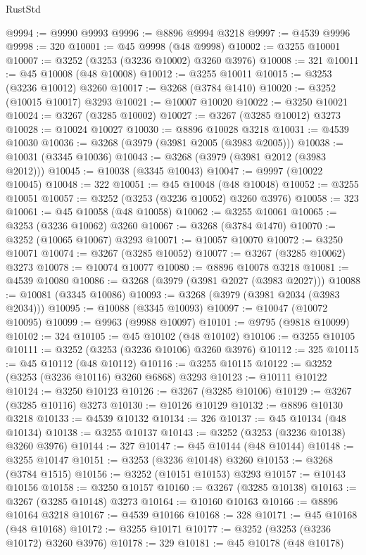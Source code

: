 \begin{lexlean}{RustStd}
\begin{coremodule}
@9994 := @9990 @9993
@9996 := @8896 @9994 @3218
@9997 := @4539 @9996
@9998 := 320
@10001 := @45 @9998 (@48 @9998)
@10002 := @3255 @10001
@10007 := @3252 (@3253 (@3236 @10002) @3260 @3976)
@10008 := 321
@10011 := @45 @10008 (@48 @10008)
@10012 := @3255 @10011
@10015 := @3253 (@3236 @10012) @3260
@10017 := @3268 (@3784 @1410)
@10020 := @3252 (@10015 @10017) @3293
@10021 := @10007 @10020
@10022 := @3250 @10021
@10024 := @3267 (@3285 @10002)
@10027 := @3267 (@3285 @10012) @3273
@10028 := @10024 @10027
@10030 := @8896 @10028 @3218
@10031 := @4539 @10030
@10036 := @3268 (@3979 (@3981 @2005 (@3983 @2005)))
@10038 := @10031 (@3345 @10036)
@10043 := @3268 (@3979 (@3981 @2012 (@3983 @2012)))
@10045 := @10038 (@3345 @10043)
@10047 := @9997 (@10022 @10045)
@10048 := 322
@10051 := @45 @10048 (@48 @10048)
@10052 := @3255 @10051
@10057 := @3252 (@3253 (@3236 @10052) @3260 @3976)
@10058 := 323
@10061 := @45 @10058 (@48 @10058)
@10062 := @3255 @10061
@10065 := @3253 (@3236 @10062) @3260
@10067 := @3268 (@3784 @1470)
@10070 := @3252 (@10065 @10067) @3293
@10071 := @10057 @10070
@10072 := @3250 @10071
@10074 := @3267 (@3285 @10052)
@10077 := @3267 (@3285 @10062) @3273
@10078 := @10074 @10077
@10080 := @8896 @10078 @3218
@10081 := @4539 @10080
@10086 := @3268 (@3979 (@3981 @2027 (@3983 @2027)))
@10088 := @10081 (@3345 @10086)
@10093 := @3268 (@3979 (@3981 @2034 (@3983 @2034)))
@10095 := @10088 (@3345 @10093)
@10097 := @10047 (@10072 @10095)
@10099 := @9963 (@9988 @10097)
@10101 := @9795 (@9818 @10099)
@10102 := 324
@10105 := @45 @10102 (@48 @10102)
@10106 := @3255 @10105
@10111 := @3252 (@3253 (@3236 @10106) @3260 @3976)
@10112 := 325
@10115 := @45 @10112 (@48 @10112)
@10116 := @3255 @10115
@10122 := @3252 (@3253 (@3236 @10116) @3260 @6868) @3293
@10123 := @10111 @10122
@10124 := @3250 @10123
@10126 := @3267 (@3285 @10106)
@10129 := @3267 (@3285 @10116) @3273
@10130 := @10126 @10129
@10132 := @8896 @10130 @3218
@10133 := @4539 @10132
@10134 := 326
@10137 := @45 @10134 (@48 @10134)
@10138 := @3255 @10137
@10143 := @3252 (@3253 (@3236 @10138) @3260 @3976)
@10144 := 327
@10147 := @45 @10144 (@48 @10144)
@10148 := @3255 @10147
@10151 := @3253 (@3236 @10148) @3260
@10153 := @3268 (@3784 @1515)
@10156 := @3252 (@10151 @10153) @3293
@10157 := @10143 @10156
@10158 := @3250 @10157
@10160 := @3267 (@3285 @10138)
@10163 := @3267 (@3285 @10148) @3273
@10164 := @10160 @10163
@10166 := @8896 @10164 @3218
@10167 := @4539 @10166
@10168 := 328
@10171 := @45 @10168 (@48 @10168)
@10172 := @3255 @10171
@10177 := @3252 (@3253 (@3236 @10172) @3260 @3976)
@10178 := 329
@10181 := @45 @10178 (@48 @10178)

\end{coremodule}
\end{lexlean}
